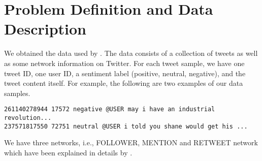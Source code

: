 
\section{Problem Definition and Data Description}
\label{Sec:ProblemData}


We obtained the data used by \cite{yang2017attention}. The data consists of a collection of tweets as well as some network information on Twitter. For each tweet sample, we have one tweet ID, one user ID, a sentiment label (positive, neutral, negative), and the tweet content itself. For example, the following are two examples of our data samples.
\begin{verbatim}
261140278944 17572 negative @USER may i have an industrial revolution...
237571817550 72751 neutral @USER i told you shane would get his ...
\end{verbatim}
We have three networks, i.e., FOLLOWER, MENTION and RETWEET network which have been explained in details by
\cite{yang2017attention}.
